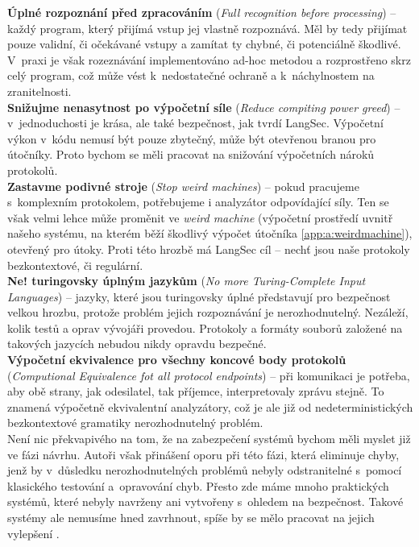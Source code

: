 \textbf{Úplné rozpoznání před zpracováním} (\textit{Full recognition before processing}) -- každý program, který přijímá vstup jej vlastně 
rozpoznává. Měl by tedy přijímat pouze validní, či očekávané vstupy a zamítat ty chybné, či potenciálně škodlivé. V~praxi je však rozeznávání 
implementováno ad-hoc metodou a rozprostřeno skrz celý program, což může vést k~nedostatečné ochraně a k~náchylnostem na zranitelnosti. \\

\textbf{Snižujme nenasytnost po výpočetní síle} (\textit{Reduce compiting power greed}) -- v~jednoduchosti je krása, ale také bezpečnost, jak tvrdí 
LangSec. Výpočetní výkon v~kódu nemusí být pouze zbytečný, může být otevřenou branou pro útočníky. Proto bychom se měli pracovat na snižování 
výpočetních nároků protokolů. \\

\textbf{Zastavme podivné stroje} (\textit{Stop weird machines}) -- pokud pracujeme s~komplexním protokolem, potřebujeme i analyzátor odpovídající 
síly. Ten se však velmi lehce může proměnit ve \textit{weird machine} (výpočetní prostředí uvnitř našeho systému, na kterém běží škodlivý výpočet 
útočníka \ref{app:a:weirdmachine}), otevřený pro útoky. Proti této hrozbě má LangSec cíl -- nechť jsou naše protokoly bezkontextové, či regulární. \\

\textbf{Ne! turingovsky úplným jazykům} (\textit{No more Turing-Complete Input Languages})  -- jazyky, které jsou turingovsky úplné 
představují pro bezpečnost velkou hrozbu, protože problém jejich rozpoznávání je nerozhodnutelný. Nezáleží, kolik testů a oprav vývojáři provedou. 
Protokoly a formáty souborů založené na takových jazycích nebudou nikdy opravdu bezpečné. \\

\textbf{Výpočetní ekvivalence pro všechny koncové body protokolů} (\textit{Computional Equivalence fot all protocol endpoints}) -- při komunikaci 
je potřeba, aby obě strany, jak odesilatel, tak příjemce, interpretovaly zprávu stejně. To znamená výpočetně ekvivalentní analyzátory, což je ale 
již od nedeterministických bezkontextové gramatiky nerozhodnutelný problém. \\

Není nic překvapivého na tom, že na zabezpečení systémů bychom měli myslet již ve fázi návrhu. Autoři však přinášení oporu při této fázi, která 
eliminuje chyby, jenž by v~důsledku nerozhodnutelných problémů nebyly odstranitelné s~pomocí klasického testování a~opravování chyb. Přesto zde máme 
mnoho praktických systémů, které nebyly navrženy ani vytvořeny s~ohledem na bezpečnost. Takové systémy ale nemusíme hned zavrhnout, spíše by se mělo 
pracovat na jejich vylepšení \cite[str. 489]{Sass2013}.

